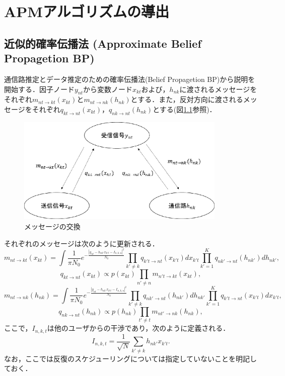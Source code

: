 \chapter{APMアルゴリズムの導出}
\label{sec:AMP}
\section{近似的確率伝播法 (Approximate Belief Propagetion BP)}
通信路推定とデータ推定のための確率伝播法(Belief Propagetion BP)から説明を開始する．因子ノード$y_{nt}$から変数ノード$x_{kt}$および，$h_{nk}$に渡されるメッセージをそれぞれ$m_{nt\to kt}(x_{kt})$と$m_{nt\to nk}(h_{nk})$とする．また，反対方向に渡されるメッセージをそれぞれ$q_{kt\to nt}(x_{kt})$，$q_{nk\to nt}(h_{nk})$とする(図\ref{fig:message}参照)．
\begin{figure}[htbp]
  \begin{center}
    \includegraphics[clip,width=10.0cm]{./message.eps}
    \caption{メッセージの交換}
    \label{fig:message}
  \end{center}
\end{figure}

それぞれのメッセージは次のように更新される．
\begin{equation}
	\label{eq:message_x}
	m_{nt\to kt}(x_{kt}) = 
		\int 
			\frac{1}{\pi N_0}
			e^
			{
				-\frac
					{|y_{nt}-h_{nk'}x_{k't}-I_{n,k,u}|^2}
					{N_0}
			}
			\prod_{k'\neq k}
				q_{k't\to nt}(x_{k't})dx_{k't}
			\prod_{k'=1}^{K}
				q_{nk'\to nt}(h_{nk'})dh_{nk'} ,
\end{equation}
\begin{equation} 
	\label{eq:message_inv_x}
	q_{kt\to nt}(x_{kt}) \propto
		p(x_{kt})
		\prod_{n'\neq n}
		m_{n't\to kt}(x_{kt}) ,
\end{equation}
\begin{equation} 
	\label{eq:message_h}
	m_{nt\to nk}(h_{nk}) = 
		\int 
			\frac{1}{\pi N_0}
			e^
			{
				-\frac
					{|y_{nt}-h_{nk'}x_{k't}-I_{n,k,u}|^2}
					{N_0}
			}
			\prod_{k'\neq k}
				q_{nk'\to nt}(h_{nk'})dh_{nk'}
			\prod_{k'=1}^{K}
				q_{k't\to nt}(x_{k't})dx_{k't} ,
\end{equation}
\begin{equation} 
	\label{eq:message_h_inv}
	q_{nk\to nt}(h_{nk}) \propto
		p(h_{nk})
		\prod_{t'\neq t}
		m_{nt'\to nk}(h_{nk}) ,
\end{equation}
ここで，$I_{n,k,t}$は他のユーザからの干渉であり，次のように定義される．
\begin{equation}
	\label{eq:I}
	I_{n,k,t}=
		\frac{1}{\sqrt{N}}
		\sum_{k'\neq k}
			h_{nk'}x_{k't}	
		.
\end{equation}
なお，ここでは反復のスケジューリングについては指定していないことを明記しておく．


